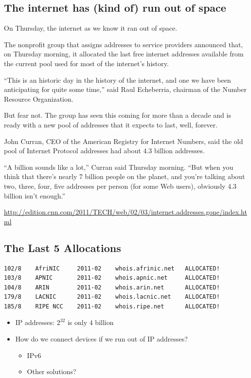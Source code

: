 \subsection{The internet has (kind of) run out of space}
\begin{tcolorbox}[colframe=red!40!white,colback=yellow!20,title=The internet has (kind of) run out of space]
    On Thursday, the internet as we know it ran out of space.

    The nonprofit group that assigns addresses to service providers announced that, on Thursday morning, it allocated the last free internet addresses available from the current pool used for most of the internet's history.

    ``This is an historic day in the history of the internet, and one we have been anticipating for quite some time,'' said Raul Echeberria, chairman of the Number Resource Organization.

    But fear not. The group has seen this coming for more than a decade and is ready with a new pool of addresses that it expects to last, well, forever.

    John Curran, CEO of the American Registry for Internet Numbers, said the old pool of Internet Protocol addresses had about 4.3 billion addresses.

    ``A billion sounds like a lot,'' Curran said Thursday morning. ``But when you think that there's nearly 7 billion people on the planet, and you're talking about two, three, four, five addresses per person (for some Web users), obviously 4.3 billion isn't enough.''

    \url{http://edition.cnn.com/2011/TECH/web/02/03/internet.addresses.gone/index.html}
\end{tcolorbox}

\subsection{The Last 5 Allocations}
\begin{verbatim}
102/8    AfriNIC     2011-02    whois.afrinic.net   ALLOCATED!
103/8    APNIC       2011-02    whois.apnic.net     ALLOCATED!
104/8    ARIN        2011-02    whois.arin.net      ALLOCATED!
179/8    LACNIC      2011-02    whois.lacnic.net    ALLOCATED!
185/8    RIPE NCC    2011-02    whois.ripe.net      ALLOCATED!
\end{verbatim}
\begin{itemize}
    \item IP addresses: $2^32$ is only $4$ billion
    \item How do we connect devices if we run out of IP addresses?
          \begin{itemize}
              \item IPv6
              \item Other solutions?
          \end{itemize}
\end{itemize}

